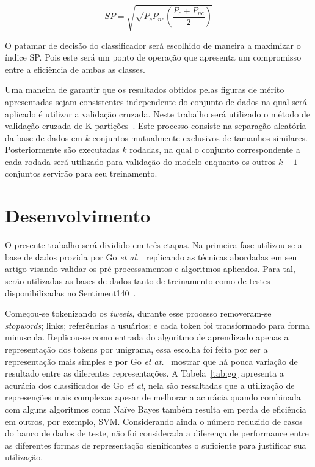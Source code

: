 \begin{equation} \label{eq:sp}
    SP = \sqrt{\sqrt{P_c P_{nc}} \left(\frac{P_c + P_{nc}}{2}\right)}
\end{equation}

O patamar de decisão do classificador será escolhido de maneira a maximizar o índice SP.
Pois este será um ponto de operação que apresenta um compromisso entre a eficiência de ambas as classes.

Uma maneira de garantir que os resultados obtidos pelas figuras de mérito apresentadas sejam consistentes independente do
conjunto de dados na qual será aplicado é utilizar a validação cruzada.
Neste trabalho será utilizado o método de validação cruzada de K-partições~\cite{kohavi95}.
Este processo consiste na separação aleatória da base de dados em $k$ conjuntos mutualmente exclusivos de tamanhos
similares.
Posteriormente são executadas $k$ rodadas, na qual o conjunto correspondente a cada rodada será utilizado para validação
do modelo enquanto os outros $k-1$ conjuntos servirão para seu treinamento.

\section{Desenvolvimento} \label{sec:desenvolvimento}

O presente trabalho será dividido em três etapas.
Na primeira fase utilizou-se a base de dados provida por Go \textit{et al.}~\cite{go09} replicando as técnicas
abordadas em seu artigo visando validar os pré-processamentos e algoritmos aplicados.
Para tal, serão utilizadas as bases de dados tanto de treinamento como de testes disponibilizadas no
Sentiment140~\cite{go09}.

Começou-se tokenizando os \textit{tweets}, durante esse processo removeram-se \textit{stopwords}; links; referências a
usuários; e cada token foi transformado para forma minuscula.
Replicou-se como entrada do algoritmo de aprendizado apenas a representação dos tokens por unigrama, essa escolha foi
feita por ser a representação mais simples e por Go \textit{et at.}~\cite{go09} mostrar que há pouca variação de
resultado entre as diferentes representações.
A Tabela~\ref{tab:go} apresenta a acurácia dos classificados de Go \textit{et al}, nela são ressaltadas que a utilização
de represenções mais complexas apesar de melhorar a acurácia quando combinada com alguns algoritmos como Naïve Bayes
também resulta em perda de eficiência em outros, por exemplo, SVM.
Considerando ainda o número reduzido de casos do banco de dados de teste, não foi considerada a diferença de performance
entre as diferentes formas de representação significantes o suficiente para justificar sua utilização.

